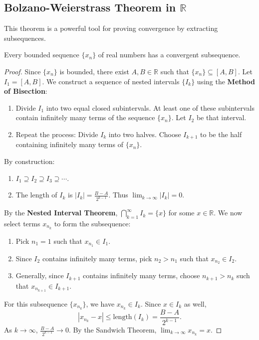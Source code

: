 \documentclass[
	UTF-8,
	11pt, %
	a4paper, %
]{LegrandOrangeBook}
\begin{document}
    \subsection{Bolzano-Weierstrass Theorem in $\mathbb{R}$}

    This theorem is a powerful tool for proving convergence by extracting subsequences.

    \begin{theorem}
    Every bounded sequence $\{x_n\}$ of real numbers has a convergent subsequence.
    \end{theorem}

    \begin{proof}
    Since $\{x_n\}$ is bounded, there exist $A, B \in \mathbb{R}$ such that $\{x_n\} \subseteq [A, B]$. 
    Let $I_1 = [A, B]$.
    We construct a sequence of nested intervals $\{I_k\}$ using the \textbf{Method of Bisection}:

    \begin{enumerate}
        \item Divide $I_1$ into two equal closed subintervals. 
        At least one of these subintervals contain infinitely many terms of 
        the sequence $\{x_n\}$. Let $I_2$ be that interval.
        \item Repeat the process: Divide $I_k$ into two halves. Choose $I_{k+1}$ to be the half 
        containing infinitely many terms of $\{x_n\}$.
    \end{enumerate}

    By construction:
    \begin{enumerate}
        \item $I_1 \supseteq I_2 \supseteq I_3 \supseteq \cdots$.
        \item The length of $I_k$ is $|I_k| = \frac{B-A}{2^{k-1}}$. Thus $\lim_{k \to \infty} |I_k| = 0$.
    \end{enumerate}

    By the \textbf{Nested Interval Theorem}, $\bigcap_{k=1}^\infty I_k = \{x\}$ for some $x \in \mathbb{R}$.
    We now select terms $x_{n_k}$ to form the subsequence:
    \begin{enumerate}
        \item Pick $n_1 = 1$ such that $x_{n_1} \in I_1$.
        \item Since $I_2$ contains infinitely many terms, pick $n_2 > n_1$ such that $x_{n_2} \in I_2$.
        \item Generally, since $I_{k+1}$ contains infinitely many terms, choose $n_{k+1} > n_k$ such that $x_{n_{k+1}} \in I_{k+1}$.
    \end{enumerate}
    For this subsequence $\{x_{n_k}\}$, we have $x_{n_k} \in I_k$. Since $x \in I_k$ as well,
    \[ |x_{n_k} - x| \le \text{length}(I_k) = \frac{B-A}{2^{k-1}}. \]
    As $k \to \infty$, $\frac{B-A}{2^{k-1}} \to 0$. By the Sandwich Theorem, $\lim_{k \to \infty} x_{n_k} = x$.
    \end{proof}
\end{document}
